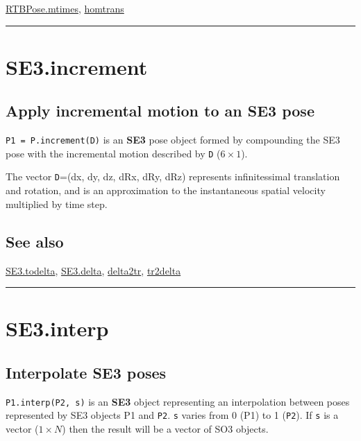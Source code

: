 \hyperlink{RTBPose.mtimes}{\color{blue} RTBPose.mtimes}, \hyperlink{homtrans}{\color{blue} homtrans}

\vspace{1.5ex}\hrule

\hypertarget{SE3.increment}{\section*{SE3.increment}}
\subsection*{Apply incremental motion to an SE3 pose}


\texttt{P1 = P.increment(D)} is an \textbf{\color{red} SE3} pose object formed by compounding the
SE3 pose with the incremental motion described by \texttt{D} ($6 \times 1$).



The vector \texttt{D}=(dx, dy, dz, dRx, dRy, dRz) represents infinitessimal translation
and rotation, and is an approximation to the instantaneous spatial velocity
multiplied by time step.


\subsection*{See also}


\hyperlink{SE3.todelta}{\color{blue} SE3.todelta}, \hyperlink{SE3.delta}{\color{blue} SE3.delta}, \hyperlink{delta2tr}{\color{blue} delta2tr}, \hyperlink{tr2delta}{\color{blue} tr2delta}

\vspace{1.5ex}\hrule

\hypertarget{SE3.interp}{\section*{SE3.interp}}
\subsection*{Interpolate SE3 poses}


\texttt{P1.interp(P2, s)} is an \textbf{\color{red} SE3} object representing an interpolation
between poses represented by SE3 objects P1 and \texttt{P2}.  \texttt{s} varies from 0
(P1) to 1 (\texttt{P2}).  If \texttt{s} is a vector ($1 \times N$) then the result will be a vector
of SO3 objects.




